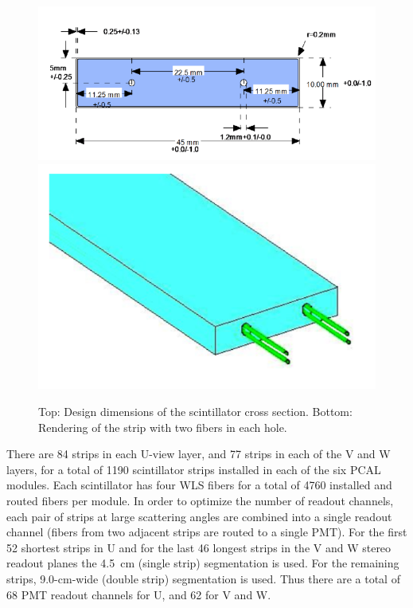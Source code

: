 \begin{figure}[hbt]
\centering
\includegraphics[width=1.05\columnwidth,keepaspectratio]{img/S3_4a.png}
\includegraphics[width=0.75\columnwidth,keepaspectratio]{img/S3_4b.png}
\caption[PCAL UVW Layers]{Top: Design dimensions of the scintillator cross section. Bottom: Rendering of the
  strip with two fibers in each hole.}
\label{fig:S3_4}
\end{figure}

There are 84 strips in each U-view layer, and 77 strips in each of the V and W layers, for a total of 1190 scintillator
strips installed in each of the six PCAL modules. Each scintillator has four WLS fibers for a total of 4760 installed
and routed fibers per module. In order to optimize the number of readout channels, each pair of strips at large
scattering angles are combined into a single readout channel (fibers from two adjacent strips are routed to a single
PMT). For the first 52 shortest strips in U and for the last 46 longest strips in the V and W stereo readout planes
the 4.5~cm (single strip) segmentation is used. For the remaining strips, 9.0-cm-wide (double strip) segmentation is
used. Thus there are a total of 68 PMT readout channels for U, and 62 for V and W.
